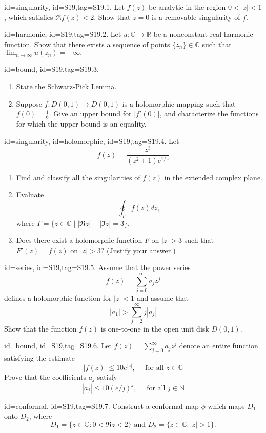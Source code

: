 \documentclass[12pt,letterpaper]{article}
\begin{document}
{\item[id=singularity, id=S19,tag=S19.1.]
Let $f(z)$ be analytic in the region $0 < | z | < 1$, which satisfies $\Re f(z) < 2$. Show that $z = 0$ is a removable singularity of $f$.
\item[id=harmonic, id=S19,tag=S19.2.]
Let $u : \mathbb{C} \rightarrow \mathbb{R}$ be a nonconstant real harmonic function. Show that there exists a sequence of points $\{z_n\} \in \mathbb{C}$ such that $\lim_{n\rightarrow \infty} u(z_n) = -\infty.$
\item[id=bound, id=S19,tag=S19.3.]
\begin{enumerate}[label=(\alph*)]\onlyitems
\item State the Schwarz-Pick Lemma.
\item Suppose $f : D(0,1) \rightarrow D(0,1)$ is a holomorphic mapping such that $f(0) = \frac{1}{6}.$ Give an upper bound for $| f'(0) |$, and characterize the functions for which the upper bound is an equality.
\end{enumerate}
\item[id=singularity, id=holomorphic, id=S19,tag=S19.4.]
Let
\[
	f(z) = \frac{z^3}{(z^2 + 1)e^{1/z}}
\]
\begin{enumerate}[label=(\alph*)]\onlyitems
\item Find and classify all the singularities of $f(z)$ in the extended complex plane.
\item Evaluate
\[
	\oint_{\Gamma} f(z) dz,
\]
where $\Gamma = \{z \in \mathbb{C} \mid | \Re z | + | \Im z | = 3\}$.
\item Does there exist a holomorphic function $F$ on $| z | > 3$ such that $F'(z) = f(z)$ on $| z | > 3$? (Justify your answer.)
\end{enumerate}

\item[id=series, id=S19,tag=S19.5.]
Assume that the power series
\[
	f(z) = \sum_{j=0}^{\infty} a_j z^j
\]
defines a holomorphic function for $| z | < 1$ and assume that
\[
	| a_1 | > \sum_{j=2}^{\infty} j | a_j |
\]
Show that the function $f(z)$ is one-to-one in the open unit disk $D(0,1)$.
\item[id=bound, id=S19,tag=S19.6.]
Let $f(z) = \sum_{j=0}^{\infty} a_j z^j$ denote an entire function satisfying the estimate
\[
	| f(z) | \le 10 e^{| z |}, \quad \text{ for all } z \in \mathbb{C}
\]
Prove that the coefficients $a_j$ satisfy
\[
	| a_j | \le 10(e/j)^j, \quad \text{ for all } j \in \mathbb{N}
\]
\item[id=conformal, id=S19,tag=S19.7.]
Construct a conformal map $\phi$ which maps $D_1$ onto $D_2$, where
\[
	D_1 = \{z \in \mathbb{C} \colon 0 < \Re z < 2\} \text{ and } D_2 = \{z \in \mathbb{C} \colon | z | > 1\}.
\]

}
\end{document}
